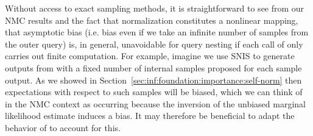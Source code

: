 

Without access to exact sampling methods, it is straightforward to see from our NMC results and
the fact that normalization constitutes a nonlinear mapping, that asymptotic bias (i.e. bias even if we take
an infinite number of samples from the outer query) is, in general, unavoidable for
query nesting if each call of \conditional only carries out finite computation.  For example, imagine we
use SNIS to generate outputs from \conditional
with a fixed number of internal samples proposed for each sample output.  As we showed in 
Section~\ref{sec:inf:foundation:importance:self-norm} then expectations with respect to such samples will be
biased, which we can think of in the NMC context as occurring because the inversion of the unbiased marginal likelihood estimate
induces a bias.  It may therefore be beneficial to adapt the behavior of \conditional to account for this.

